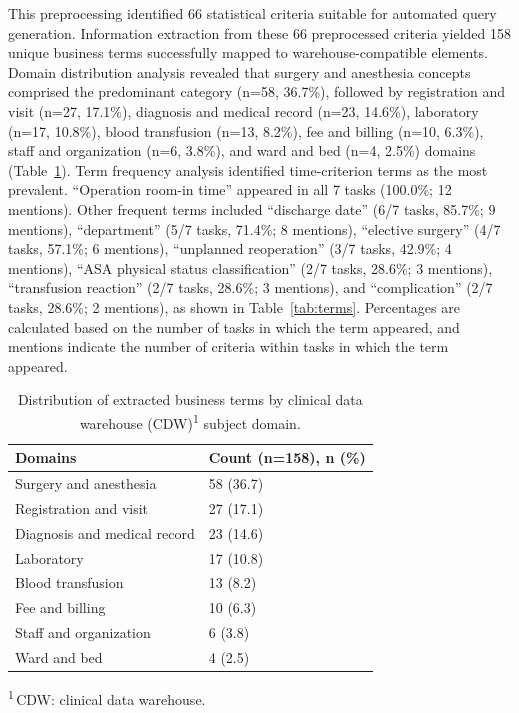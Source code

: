 \documentclass[applsci,article,submit,pdftex,oneauthor]{Definitions/mdpi}
\newcommand{\tnote}[1]{\textsuperscript{#1}}
\newcommand{\tabfoot}[1]{\par\vspace{2pt}\begingroup\raggedright\footnotesize
  \noindent #1\par\endgroup}
\newcommand{\tnotedef}[1]{\textsuperscript{#1}\,}
\begin{document}
This preprocessing identified 66 statistical criteria suitable for automated
query generation. Information extraction from these 66 preprocessed criteria
yielded 158 unique business terms successfully mapped to warehouse-compatible
elements. Domain distribution analysis revealed that surgery and anesthesia
concepts comprised the predominant category (n=58, 36.7\%), followed by registration and visit (n=27, 17.1\%), diagnosis and medical record (n=23, 14.6\%), laboratory (n=17, 10.8\%), blood transfusion (n=13, 8.2\%), fee and billing (n=10, 6.3\%), staff and organization (n=6, 3.8\%), and ward and bed (n=4, 2.5\%) domains (Table~\ref{tab:domains}). Term frequency analysis
identified time-criterion terms as the most prevalent. ``Operation room-in
time'' appeared in all 7 tasks (100.0\%; 12 mentions). Other frequent terms
included ``discharge date'' (6/7 tasks, 85.7\%; 9 mentions), ``department'' (5/7 tasks, 71.4\%; 8 mentions), ``elective surgery'' (4/7 tasks, 57.1\%; 6 mentions), ``unplanned reoperation'' (3/7 tasks, 42.9\%; 4 mentions), ``ASA
physical status classification'' (2/7 tasks, 28.6\%; 3 mentions), ``transfusion
reaction'' (2/7 tasks, 28.6\%; 3 mentions), and ``complication'' (2/7 tasks, 28.6\%; 2 mentions), as shown in Table~\ref{tab:terms}. Percentages are
calculated based on the number of tasks in which the term appeared, and mentions
indicate the number of criteria within tasks in which the term appeared.

\begin{table}[H]
\caption{Distribution of extracted business terms by clinical data warehouse
(CDW)\tnote{1} subject domain.}
\label{tab:domains}
\centering
\footnotesize
\begin{tabular*}{\linewidth}{@{\extracolsep{\fill}}ll@{}}
\toprule
Domains & Count (n=158), n (\%)\\
\midrule
Surgery and anesthesia        & 58 (36.7)\\
Registration and visit        & 27 (17.1)\\
Diagnosis and medical record  & 23 (14.6)\\
Laboratory                    & 17 (10.8)\\
Blood transfusion             & 13 (8.2)\\
Fee and billing               & 10 (6.3)\\
Staff and organization        & 6 (3.8)\\
Ward and bed                  & 4 (2.5)\\
\bottomrule
\end{tabular*}
\tabfoot{\tnotedef{1}CDW: clinical data warehouse.}
\end{table}
\end{document}
